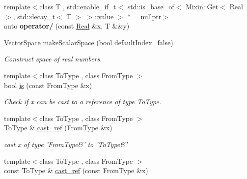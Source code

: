 \begin{DoxyCompactItemize}
\item 
\hypertarget{namespaceSpacy_af180e266f73b104cb351ec67778b8cfd}{{\footnotesize template$<$class T , std\-::enable\-\_\-if\-\_\-t$<$ std\-::is\-\_\-base\-\_\-of$<$ Mixin\-::\-Get$<$ Real $>$, std\-::decay\-\_\-t$<$ T $>$ $>$\-::value $>$ $\ast$  = nullptr$>$ }\\auto {\bfseries operator/} (const \hyperlink{classSpacy_1_1Real}{\-Real} \&x, \-T \&\&y)}\label{namespaceSpacy_af180e266f73b104cb351ec67778b8cfd}

\item 
\hyperlink{classSpacy_1_1VectorSpace}{\-Vector\-Space} \hyperlink{namespaceSpacy_a3e51c65a8900b247c46021039c4c823a}{make\-Scalar\-Space} (bool default\-Index=false)
\begin{DoxyCompactList}\small\item\em \-Construct space of real numbers. \end{DoxyCompactList}\item 
\hypertarget{namespaceSpacy_ae44bfd08fa77272bab4149665b26233a}{{\footnotesize template$<$class To\-Type , class From\-Type $>$ }\\bool \hyperlink{namespaceSpacy_ae44bfd08fa77272bab4149665b26233a}{is} (const \-From\-Type \&x)}\label{namespaceSpacy_ae44bfd08fa77272bab4149665b26233a}

\begin{DoxyCompactList}\small\item\em \-Check if x can be cast to a reference of type \-To\-Type. \end{DoxyCompactList}\item 
\hypertarget{namespaceSpacy_abb0550fc1d402f00e42c165ae8eb3305}{{\footnotesize template$<$class To\-Type , class From\-Type $>$ }\\\-To\-Type \& \hyperlink{namespaceSpacy_abb0550fc1d402f00e42c165ae8eb3305}{cast\-\_\-ref} (\-From\-Type \&x)}\label{namespaceSpacy_abb0550fc1d402f00e42c165ae8eb3305}

\begin{DoxyCompactList}\small\item\em cast x of type '\-From\-Type\&' to '\-To\-Type\&' \end{DoxyCompactList}\item 
\hypertarget{namespaceSpacy_a00fc9d674cd8813c4e20a05adf3aaaa4}{{\footnotesize template$<$class To\-Type , class From\-Type $>$ }\\const \-To\-Type \& \hyperlink{namespaceSpacy_a00fc9d674cd8813c4e20a05adf3aaaa4}{cast\-\_\-ref} (const \-From\-Type \&x)}\label{namespaceSpacy_a00fc9d674cd8813c4e20a05adf3aaaa4}


\end{DoxyCompactItemize}
